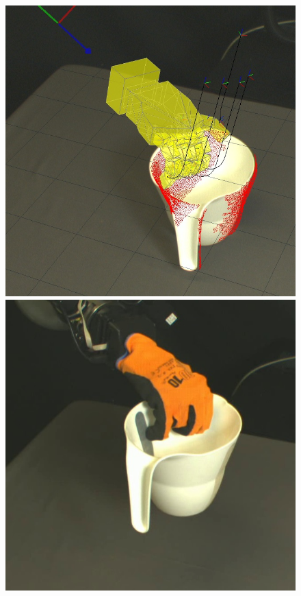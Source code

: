 \begin{figure}
\begin{center}
  \includegraphics[width=\tw]{images/experiments/query/jug-1-s}
 \includegraphics[width=\tw]{images/experiments/exec/jug-s}

\end{center}
\end{figure}
